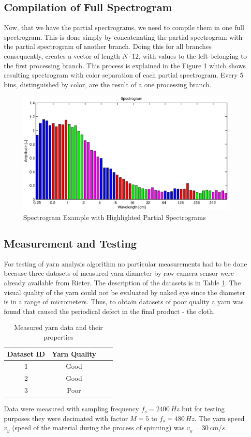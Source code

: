 \documentclass[twoside]{ctuthesis}
\theoremstyle{plain}
\theoremstyle{definition}
\theoremstyle{note}
\begin{document}
\subsection{Compilation of Full Spectrogram}
Now, that we have the partial spectrograms, we need to compile them in one full spectrogram. This is done simply by concatenating the partial spectrogram with the partial spectrogram of another branch. Doing this for all branches consequently, creates a vector of length $N\cdot 12$, with values to the left belonging to the first processing branch. This process is explained in the Figure \ref{fig:yarnSpec_color} which shows resulting spectrogram with color separation of each partial spectrogram. Every 5 bins, distinguished by color, are the result of a one processing branch.
\begin{figure}[h]
	\centering
	\includegraphics[width=1.0\textwidth]{sp_barevny.eps}
	\caption{Spectrogram Example with Highlighted Partial Spectrograms}
	\label{fig:yarnSpec_color}
\end{figure}

\subsection{Measurement and Testing}
For testing of yarn analysis algorithm no particular measurements had to be done because three datasets of measured yarn diameter by raw camera sensor were already available from Rieter. The description of the datasets is in Table \ref{tab:measuredDataYarn}. The visual quality of the yarn could not be evaluated by naked eye since the diameter is in a range of micrometers. Thus, to obtain datasets of poor quality a yarn was found that caused the periodical defect in the final product - the cloth.
\begin{table}[htbp]
	\centering
	\caption{Measured yarn data and their properties}
	\begin{tabular}{cccc}
		\toprule
		Dataset ID & Yarn Quality \\
		\midrule
		1     & Good \\
		2     & Good \\
		3     & Poor \\
		\bottomrule
	\end{tabular}%
	\label{tab:measuredDataYarn}%
\end{table}%
Data were measured with sampling frequency $f_s=2400\,Hz$ but for testing purposes they were decimated with factor $M = 5$ to $f_s=480\,Hz$. The yarn speed $v_y$ (speed of the material during the process of spinning) was $v_y=30\,cm/s$.
\end{document}
